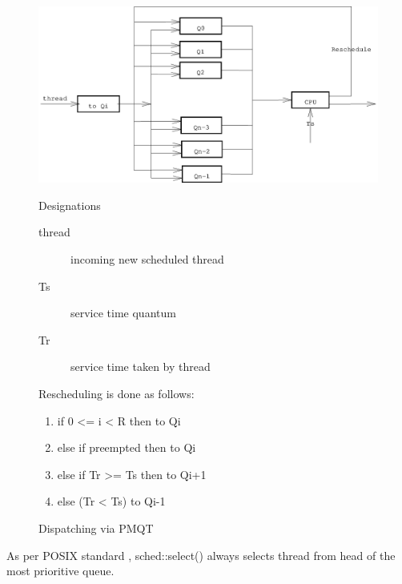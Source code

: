 \documentclass[onecolumn]{article}
\begin{document}
\begin{figure}[ht]
\begin{center}
\includegraphics{PMQT.eps}
\caption{Dispatching via PMQT}
\label{fig:dispatch-pmqt}
\end{center}

\par Designations
\begin{description}
\item[ thread ] incoming new scheduled thread
\item[ Ts ] service time quantum
\item[ Tr ] service time taken by thread
\end{description}

\par Rescheduling is done as follows:
\begin{enumerate}
\item if 0 <= i < R then to Qi
\item else if preempted then to Qi
\item      else if Tr >= Ts then to Qi+1
\item      else (Tr < Ts) to Qi-1
\end{enumerate}

\end{figure}

\par As per POSIX standard \cite{posix}, sched::select() always selects thread from head of the most
prioritive queue.

\small



\end{document}
